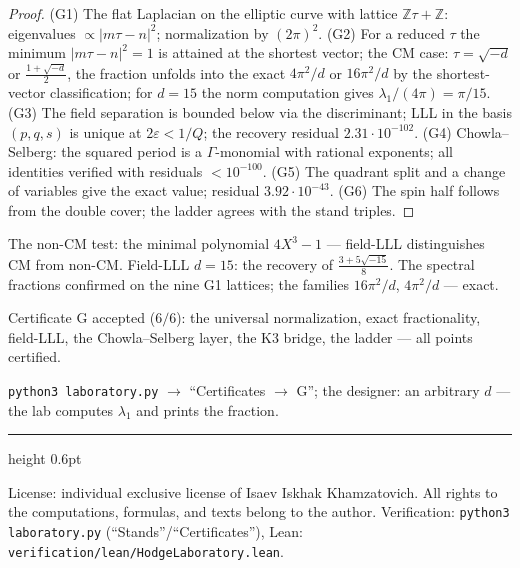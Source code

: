 \documentclass[11pt,a4paper]{article}
\theoremstyle{plain}
\theoremstyle{definition}
\theoremstyle{remark}
\newcommand{\ZZ}{\mathbb{Z}}
\newcommand{\Ga}{\Gamma}
\begin{document}
\begin{proof}
(G1) The flat Laplacian on the elliptic curve with lattice
$\ZZ\tau+\ZZ$: eigenvalues $\propto|m\tau-n|^2$; normalization by
$(2\pi)^2$.
(G2) For a reduced $\tau$ the minimum $|m\tau-n|^2=1$ is attained at
the shortest vector; the CM case: $\tau=\sqrt{-d}$ or
$\frac{1+\sqrt{-d}}2$, the fraction unfolds into the exact
$4\pi^2/d$ or $16\pi^2/d$ by the shortest-vector classification;
for $d=15$ the norm computation gives $\lambda_1/(4\pi)=\pi/15$.
(G3) The field separation is bounded below via the discriminant;
LLL in the basis $(p,q,s)$ is unique at $2\varepsilon<1/Q$; the
recovery residual $2.31\cdot10^{-102}$.
(G4) Chowla--Selberg: the squared period is a $\Ga$-monomial with
rational exponents; all identities verified with residuals
$<10^{-100}$.
(G5) The quadrant split and a change of variables give the exact
value; residual $3.92\cdot10^{-43}$.
(G6) The spin half follows from the double cover; the ladder agrees
with the stand triples.
\end{proof}

\begin{databox}[numbers]
The non-CM test: the minimal polynomial $4X^3-1$ --- field-LLL
distinguishes CM from non-CM. Field-LLL $d=15$: the recovery of
$\frac{3+5\sqrt{-15}}8$. The spectral fractions confirmed on the
nine G1 lattices; the families $16\pi^2/d$, $4\pi^2/d$ --- exact.
\end{databox}

\begin{statusbox}[summary]
Certificate G accepted ($6/6$): the universal normalization, exact
fractionality, field-LLL, the Chowla--Selberg layer, the K3 bridge,
the ladder --- all points certified.
\end{statusbox}

\begin{verifybox}[reproduction]
\texttt{python3 laboratory.py} $\to$ ``Certificates $\to$ G''; the
designer: an arbitrary $d$ --- the lab computes $\lambda_1$ and
prints the fraction.
\end{verifybox}

\vfill
{\color{linkblue}\hrule height 0.6pt}
\vspace{0.5em}
{\small\color{gray}
License: individual exclusive license of Isaev Iskhak Khamzatovich.
All rights to the computations, formulas, and texts belong to the author.
Verification: \texttt{python3 laboratory.py} (``Stands''/``Certificates''),
Lean: \texttt{verification/lean/HodgeLaboratory.lean}.
}
\end{document}
